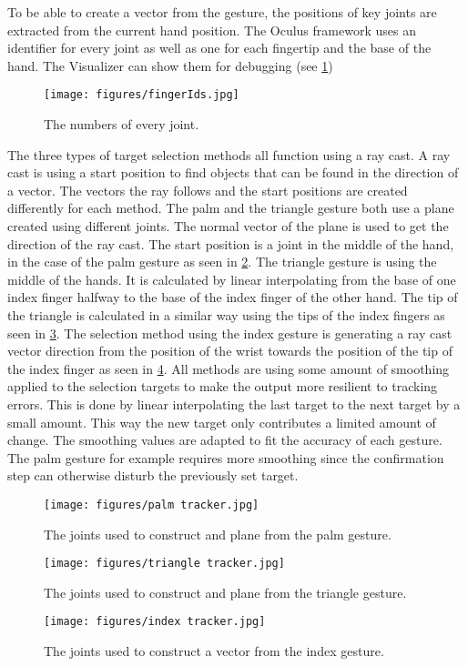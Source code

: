 To be able to create a vector from the gesture, the positions of key joints are extracted from the current hand position. The Oculus framework uses an identifier for every joint as well as one for each fingertip and the base of the hand. The Visualizer can show them for debugging (see \ref{fig:fingerIds})

\begin{figure}[!ht]
    \centering
    \texttt{[image: figures/fingerIds.jpg]}
    \caption{The numbers of every joint.}
    \label{fig:fingerIds}
\end{figure}

The three types of target selection methods all function using a ray cast. A ray cast is using a start position to find objects that can be found in the direction of a vector. The vectors the ray follows and the start positions are created differently for each method. 
The palm and the triangle gesture both use a plane created using different joints. The normal vector of the plane is used to get the direction of the ray cast. The start position is a joint in the middle of the hand, in the case of the palm gesture as seen in \ref{fig:palmTracker}. The triangle gesture is using the middle of the hands. It is calculated by linear interpolating from the base of one index finger halfway to the base of the index finger of the other hand. The tip of the triangle is calculated in a similar way using the tips of the index fingers as seen in \ref{fig:triangleTracker}. The selection method using the index gesture is generating a ray cast vector direction from the position of the wrist towards the position of the tip of the index finger as seen in \ref{fig:indexTracker}. All methods are using some amount of smoothing applied to the selection targets to make the output more resilient to tracking errors. This is done by linear interpolating the last target to the next target by a small amount. This way the new target only contributes a limited amount of change. The smoothing values are adapted to fit the accuracy of each gesture. The palm gesture for example requires more smoothing since the confirmation step can otherwise disturb the previously set target.

\begin{figure}[!ht]
    \centering
    \texttt{[image: figures/palm tracker.jpg]}
    \caption{The joints used to construct and plane from the palm gesture.}
    \label{fig:palmTracker}
\end{figure}
\begin{figure}[!ht]
    \centering
    \texttt{[image: figures/triangle tracker.jpg]}
    \caption{The joints used to construct and plane from the triangle gesture.}
    \label{fig:triangleTracker}
\end{figure}
\begin{figure}[!ht]
    \centering
    \texttt{[image: figures/index tracker.jpg]}
    \caption{The joints used to construct a vector from the index gesture.}
    \label{fig:indexTracker}
\end{figure}

